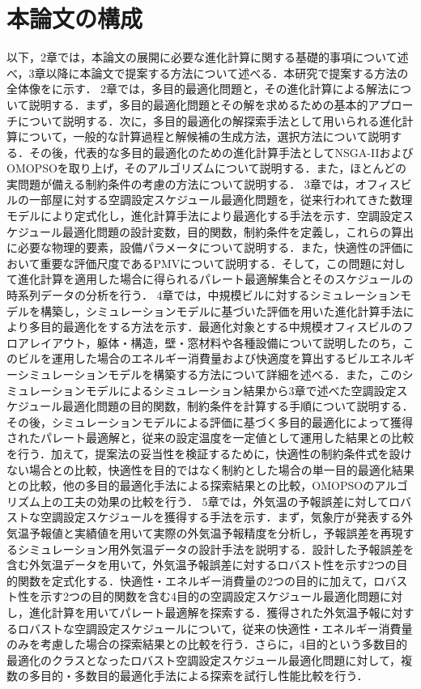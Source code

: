 \section{本論文の構成}
以下，2章では，本論文の展開に必要な進化計算に関する基礎的事項について述べ，3章以降に本論文で提案する方法について述べる．本研究で提案する方法の全体像をに示す．
2章では，多目的最適化問題と，その進化計算による解法について説明する．まず，多目的最適化問題とその解を求めるための基本的アプローチについて説明する．次に，多目的最適化の解探索手法として用いられる進化計算について，一般的な計算過程と解候補の生成方法，選択方法について説明する．その後，代表的な多目的最適化のための進化計算手法としてNSGA-IIおよびOMOPSOを取り上げ，そのアルゴリズムについて説明する．また，ほとんどの実問題が備える制約条件の考慮の方法について説明する．
3章では，オフィスビルの一部屋に対する空調設定スケジュール最適化問題を，従来行われてきた数理モデルにより定式化し，進化計算手法により最適化する手法を示す．空調設定スケジュール最適化問題の設計変数，目的関数，制約条件を定義し，これらの算出に必要な物理的要素，設備パラメータについて説明する．また，快適性の評価において重要な評価尺度であるPMVについて説明する．そして，この問題に対して進化計算を適用した場合に得られるパレート最適解集合とそのスケジュールの時系列データの分析を行う．
4章では，中規模ビルに対するシミュレーションモデルを構築し，シミュレーションモデルに基づいた評価を用いた進化計算手法により多目的最適化をする方法を示す．最適化対象とする中規模オフィスビルのフロアレイアウト，躯体・構造，壁・窓材料や各種設備について説明したのち，このビルを運用した場合のエネルギー消費量および快適度を算出するビルエネルギーシミュレーションモデルを構築する方法について詳細を述べる．また，このシミュレーションモデルによるシミュレーション結果から3章で述べた空調設定スケジュール最適化問題の目的関数，制約条件を計算する手順について説明する．その後，シミュレーションモデルによる評価に基づく多目的最適化によって獲得されたパレート最適解と，従来の設定温度を一定値として運用した結果との比較を行う．加えて，提案法の妥当性を検証するために，快適性の制約条件式を設けない場合との比較，快適性を目的ではなく制約とした場合の単一目的最適化結果との比較，他の多目的最適化手法による探索結果との比較，OMOPSOのアルゴリズム上の工夫の効果の比較を行う．
5章では，外気温の予報誤差に対してロバストな空調設定スケジュールを獲得する手法を示す．まず，気象庁が発表する外気温予報値と実績値を用いて実際の外気温予報精度を分析し，予報誤差を再現するシミュレーション用外気温データの設計手法を説明する．設計した予報誤差を含む外気温データを用いて，外気温予報誤差に対するロバスト性を示す2つの目的関数を定式化する．快適性・エネルギー消費量の2つの目的に加えて，ロバスト性を示す2つの目的関数を含む4目的の空調設定スケジュール最適化問題に対し，進化計算を用いてパレート最適解を探索する．獲得された外気温予報に対するロバストな空調設定スケジュールについて，従来の快適性・エネルギー消費量のみを考慮した場合の探索結果との比較を行う．さらに，4目的という多数目的最適化のクラスとなったロバスト空調設定スケジュール最適化問題に対して，複数の多目的・多数目的最適化手法による探索を試行し性能比較を行う．
